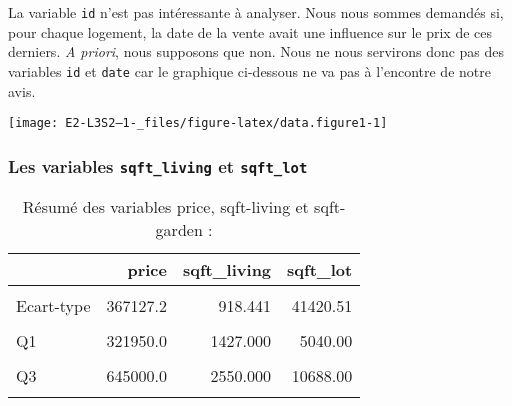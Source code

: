 \documentclass[
  11pt,
  french,
]{article}
\newenvironment{Shaded}{\begin{snugshade}}{\end{snugshade}}
\newcommand{\DecValTok}[1]{\textcolor[rgb]{0.00,0.00,0.81}{#1}}
\newcommand{\KeywordTok}[1]{\textcolor[rgb]{0.13,0.29,0.53}{\textbf{#1}}}
\newcommand{\NormalTok}[1]{#1}
\newcommand{\OperatorTok}[1]{\textcolor[rgb]{0.81,0.36,0.00}{\textbf{#1}}}
\newcommand{\StringTok}[1]{\textcolor[rgb]{0.31,0.60,0.02}{#1}}
\begin{document}
\begin{Shaded}
\end{Shaded}

La variable \texttt{id} n'est pas intéressante à analyser. Nous nous
sommes demandés si, pour chaque logement, la date de la vente avait une
influence sur le prix de ces derniers. \textit{A priori}, nous supposons
que non. Nous ne nous servirons donc pas des variables \texttt{id} et
\texttt{date} car le graphique ci-dessous ne va pas à l'encontre de
notre avis.

\begin{center}\texttt{[image: E2-L3S2--1-\_files/figure-latex/data.figure1-1]} \end{center}

\newpage

\hypertarget{les-variables-sqft_living-et-sqft_lot}{%
\subsubsection{\texorpdfstring{Les variables \texttt{sqft\_living} et
\texttt{sqft\_lot}}{Les variables sqft\_living et sqft\_lot}}\label{les-variables-sqft_living-et-sqft_lot}}

\begin{table}[!h]

\caption{\label{tab:unnamed-chunk-2}Résumé des variables price, sqft-living et sqft-garden :}
\centering
\begin{tabular}[t]{lrrr}
\toprule
  & price & sqft\_living & sqft\_lot\\
\midrule
\cellcolor{gray!6}{Moyenne} & \cellcolor{gray!6}{540088.1} & \cellcolor{gray!6}{2079.900} & \cellcolor{gray!6}{15106.97}\\
Ecart-type & 367127.2 & 918.441 & 41420.51\\
\cellcolor{gray!6}{Minimum} & \cellcolor{gray!6}{75000.0} & \cellcolor{gray!6}{290.000} & \cellcolor{gray!6}{520.00}\\
Q1 & 321950.0 & 1427.000 & 5040.00\\
\cellcolor{gray!6}{Q2} & \cellcolor{gray!6}{450000.0} & \cellcolor{gray!6}{1910.000} & \cellcolor{gray!6}{7618.00}\\
\addlinespace
Q3 & 645000.0 & 2550.000 & 10688.00\\
\cellcolor{gray!6}{Maximum} & \cellcolor{gray!6}{7700000.0} & \cellcolor{gray!6}{13540.000} & \cellcolor{gray!6}{1651359.00}\\
\bottomrule
\end{tabular}
\end{table}
\end{document}

